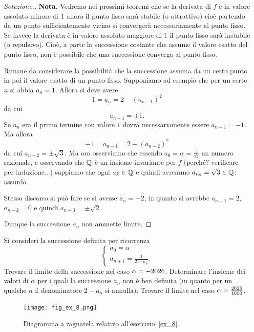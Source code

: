 \begin{proof}[Soluzione.]
  \textbf{Nota.} Vedremo nei prossimi teoremi che
  se la derivata di $f$ è in valore assoluto minore di
  $1$ allora il punto fisso sarà stabile (o attrattivo) cioè partendo
  da un punto sufficientemente vicino si convergerà necessariamente al
  punto fisso. Se invece la derivata è in valore assoluto maggiore di
  $1$ il punto fisso sarà instabile (o repulsivo). Cioè, a parte la
  successione costante che assume il valore esatto del punto fisso,
  non è
  possibile che una successione converga al punto fisso.

  Rimane da considerare la possibilità che la successione assuma da un
  certo punto in poi il valore esatto di un punto fisso. Supponiamo ad
  esempio che per un certo $n$ si abbia $a_n=1$. Allora si deve avere
  \[
  1 = a_n = 2-(a_{n-1})^2
  \]
  da cui
  \[
  a_{n-1} = \pm 1.
  \]
  Se $a_n$ era il primo termine con valore $1$ dovrà necessariamente
  essere $a_{n-1} = -1$. Ma allora
  \[
  -1 = a_{n-1} = 2-(a_{n-2})^2
  \]
  da cui $a_{n-2} = \pm \sqrt 3$. Ma ora osserviamo che essendo $a_0=
  \alpha = \frac 1 {42}$ un numero razionale, e osservando che $\mathbb Q$ è un
  insieme invariante per $f$ (perché? verificare per induzione...)
  sappiamo che ogni $a_k \in \mathbb Q$ e quindi
  avremmo $a_{n_2} = \sqrt 3 \in \mathbb Q$: assurdo.

  Stesso discorso si può fare se si avesse $a_n=-2$, in quanto si
  avrebbe $a_{n-1} = 2$, $a_{n-2} = 0$ e quindi $a_{n-3}=\pm \sqrt 2$.

  Dunque la successione $a_n$ non ammette limite.
\end{proof}

\begin{exercise}\label{ex_8}
  Si consideri la successione definita per ricorrenza
  \[
  \begin{cases}
    a_0 = \alpha\\
    a_{n+1} = \frac{1}{2-a_n}.
  \end{cases}
  \]
  Trovare il limite della successione nel caso $\alpha =
  -\the\year$. Determinare l'insieme dei valori di $\alpha$ per i quali la
  successione $a_n$ non è ben definita (in quanto per un qualche $n$ il
  denominatore $2-a_n$ si annulla).
  Trovare il limite nel caso $\alpha=\frac{\the\year}{1000}$.
\end{exercise}

\begin{figure}
 \begin{center}
    \texttt{[image: fig\_ex\_8.png]}
  \end{center}
  \caption{Diagramma a ragnatela relativo
    all'esercizio~\ref{ex_8}.}
  \label{fig_ex_8}
\end{figure}

